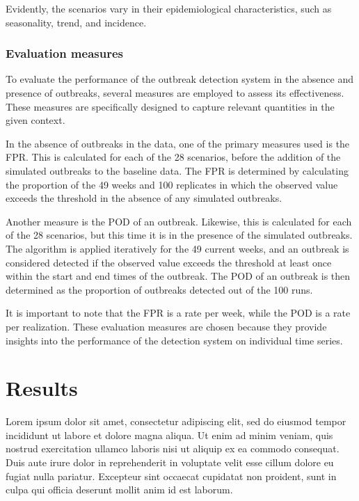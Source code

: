 \documentclass[preprint, 3p, authoryear]{elsarticle} %
\begin{document}
Evidently, the scenarios vary in their epidemiological characteristics, such as seasonality, trend, and incidence.

\hypertarget{evaluation-measures}{%
\subsubsection{Evaluation measures}\label{evaluation-measures}}

To evaluate the performance of the outbreak detection system in the absence and presence of outbreaks, several measures are employed to assess its effectiveness. These measures are specifically designed to capture relevant quantities in the given context.

In the absence of outbreaks in the data, one of the primary measures used is the FPR. This is calculated for each of the 28 scenarios, before the addition of the simulated outbreaks to the baseline data. The FPR is determined by calculating the proportion of the 49 weeks and 100 replicates in which the observed value exceeds the threshold in the absence of any simulated outbreaks.

Another measure is the POD of an outbreak. Likewise, this is calculated for each of the 28 scenarios, but this time it is in the presence of the simulated outbreaks. The algorithm is applied iteratively for the 49 current weeks, and an outbreak is considered detected if the observed value exceeds the threshold at least once within the start and end times of the outbreak. The POD of an outbreak is then determined as the proportion of outbreaks detected out of the 100 runs.

It is important to note that the FPR is a rate per week, while the POD is a rate per realization. These evaluation measures are chosen because they provide insights into the performance of the detection system on individual time series.

\hypertarget{results}{%
\section{Results}\label{results}}

Lorem ipsum dolor sit amet, consectetur adipiscing elit, sed do eiusmod tempor incididunt ut labore et dolore magna aliqua. Ut enim ad minim veniam, quis nostrud exercitation ullamco laboris nisi ut aliquip ex ea commodo consequat. Duis aute irure dolor in reprehenderit in voluptate velit esse cillum dolore eu fugiat nulla pariatur. Excepteur sint occaecat cupidatat non proident, sunt in culpa qui officia deserunt mollit anim id est laborum.
\end{document}
